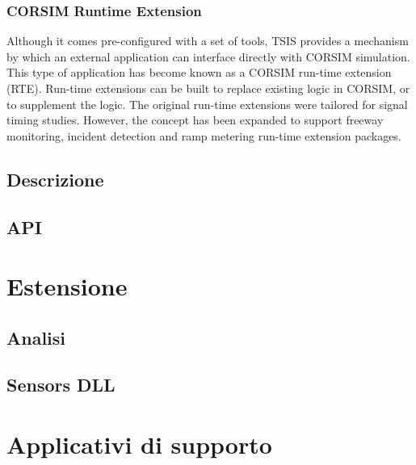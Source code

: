 \subsubsection{CORSIM Runtime Extension}

Although it comes pre-configured with a set of tools, TSIS provides a mechanism by which an external application
can interface directly with CORSIM simulation. This type of application has become known as a CORSIM run-time
extension (RTE). Run-time extensions can be built to replace existing logic in CORSIM, or to supplement the
logic. The original run-time extensions were tailored for signal timing studies. However, the concept has been
expanded to support freeway monitoring, incident detection and ramp metering run-time extension packages.

\subsection{Descrizione}

\subsection{API}

\section{Estensione}

\subsection{Analisi}

\subsection{Sensors DLL}

\section{Applicativi di supporto}
